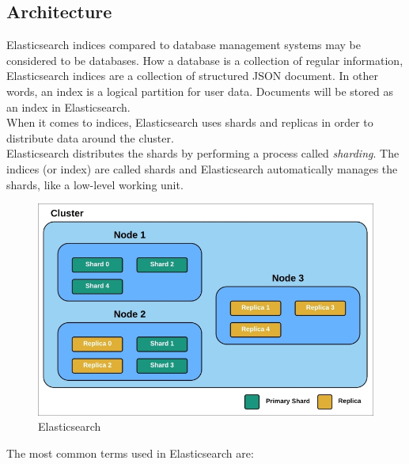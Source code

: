 \subsection{Architecture~\cite{elastic3}}
Elasticsearch indices compared to database management systems may be considered to be databases. How a database is a collection of regular information, Elasticsearch indices are a collection of structured JSON document. In other words, an index is a logical partition for user data. Documents will be stored as an index in Elasticsearch.\\
When it comes to indices, Elasticsearch uses shards and replicas in order to distribute data around the cluster.\\
 Elasticsearch distributes the shards by performing a process called \textit{sharding}. The indices (or index) are called shards and Elasticsearch automatically manages the shards, like a low-level working unit.
\begin{figure}
	\includegraphics[width=\linewidth]{img/elasticsearch.jpeg}
	\caption{Elasticsearch~\cite{elastic3}}
	\label{fig:elastic1}
\end{figure}
The most common terms used in Elasticsearch are:
